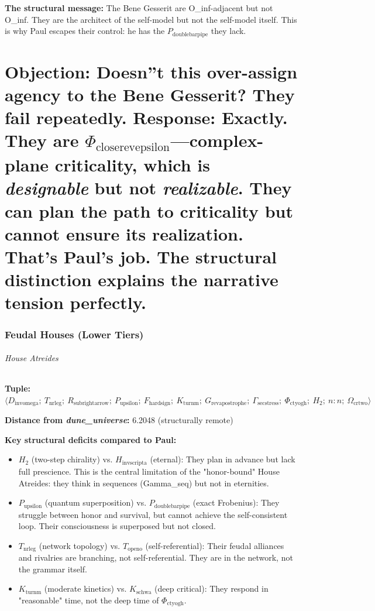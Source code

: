 \documentclass[12pt,a4paper]{article}
\begin{document}
\textbf{The structural message:} The Bene Gesserit are O\_inf-adjacent but not O\_inf. They are the architect of the self-model but not the self-model itself. This is why Paul escapes their control: he has the $P_{\text{doublebarpipe}}$ they lack.

\part{\textbf{Objection:} Doesn''t this over-assign agency to the Bene Gesserit? They fail repeatedly. Response: Exactly. They are $\Phi_{\text{closerevepsilon}}$---complex-plane criticality, which is \emph{designable} but not \emph{realizable}. They can plan the path to criticality but cannot ensure its realization. That's Paul's job. The structural distinction explains the narrative tension perfectly.}

\section{Feudal Houses (Lower Tiers)}

\paragraph{House Atreides}

\textbf{Tuple:} $\langle D_{\text{invomega}};\ T_{\text{nrleg}};\ R_{\text{subrightarrow}};\ P_{\text{upsilon}};\ F_{\text{hardsign}};\ K_{\text{turnm}};\ G_{\text{revapostrophe}};\ \Gamma_{\text{secstress}};\ \Phi_{\text{ctyogh}};\ H_2;\ n{:}n;\ \Omega_{\text{crtwo}} \rangle$

\textbf{Distance from \emph{dune\_universe}:} 6.2048 (structurally remote)

\textbf{Key structural deficits compared to Paul:}

\begin{itemize}
    \item $H_2$ (two-step chirality) vs. $H_{\text{invscripta}}$ (eternal): They plan in advance but lack full prescience. This is the central limitation of the "honor-bound" House Atreides: they think in sequences (Gamma\_seq) but not in eternities.
    \item $P_{\text{upsilon}}$ (quantum superposition) vs. $P_{\text{doublebarpipe}}$ (exact Frobenius): They struggle between honor and survival, but cannot achieve the self-consistent loop. Their consciousness is superposed but not closed.
    \item $T_{\text{nrleg}}$ (network topology) vs. $T_{\text{openo}}$ (self-referential): Their feudal alliances and rivalries are branching, not self-referential. They are in the network, not the grammar itself.
    \item $K_{\text{turnm}}$ (moderate kinetics) vs. $K_{\text{schwa}}$ (deep critical): They respond in "reasonable" time, not the deep time of $\Phi_{\text{ctyogh}}$.
\end{itemize}
\end{document}
